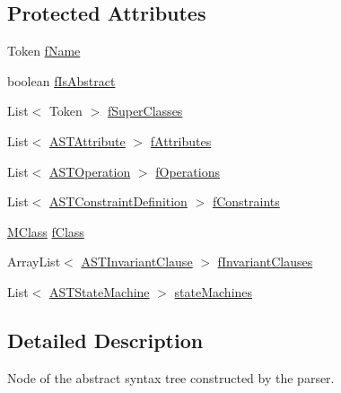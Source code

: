 \subsection*{Protected Attributes}
\begin{DoxyCompactItemize}
\item 
Token \hyperlink{classorg_1_1tzi_1_1use_1_1parser_1_1use_1_1_a_s_t_class_a0c2533e2c8c8e5426c0a87dad0cf850c}{f\-Name}
\item 
boolean \hyperlink{classorg_1_1tzi_1_1use_1_1parser_1_1use_1_1_a_s_t_class_af0ddeb5fdaf847dc54d64ed7d4bcfc5a}{f\-Is\-Abstract}
\item 
List$<$ Token $>$ \hyperlink{classorg_1_1tzi_1_1use_1_1parser_1_1use_1_1_a_s_t_class_a35b71bf1905c82b57cc223433bbedcb0}{f\-Super\-Classes}
\item 
List$<$ \hyperlink{classorg_1_1tzi_1_1use_1_1parser_1_1use_1_1_a_s_t_attribute}{A\-S\-T\-Attribute} $>$ \hyperlink{classorg_1_1tzi_1_1use_1_1parser_1_1use_1_1_a_s_t_class_a15f5be780ef36986a4f94afbe4d80140}{f\-Attributes}
\item 
List$<$ \hyperlink{classorg_1_1tzi_1_1use_1_1parser_1_1use_1_1_a_s_t_operation}{A\-S\-T\-Operation} $>$ \hyperlink{classorg_1_1tzi_1_1use_1_1parser_1_1use_1_1_a_s_t_class_aa91a9797761f3f7260d8d632bf167ae0}{f\-Operations}
\item 
List$<$ \hyperlink{classorg_1_1tzi_1_1use_1_1parser_1_1use_1_1_a_s_t_constraint_definition}{A\-S\-T\-Constraint\-Definition} $>$ \hyperlink{classorg_1_1tzi_1_1use_1_1parser_1_1use_1_1_a_s_t_class_aa87b63de84b1ab405c1b484ae663bdd5}{f\-Constraints}
\item 
\hyperlink{interfaceorg_1_1tzi_1_1use_1_1uml_1_1mm_1_1_m_class}{M\-Class} \hyperlink{classorg_1_1tzi_1_1use_1_1parser_1_1use_1_1_a_s_t_class_ad31d3b0c19e264bc511403a79458cee6}{f\-Class}
\item 
Array\-List$<$ \hyperlink{classorg_1_1tzi_1_1use_1_1parser_1_1use_1_1_a_s_t_invariant_clause}{A\-S\-T\-Invariant\-Clause} $>$ \hyperlink{classorg_1_1tzi_1_1use_1_1parser_1_1use_1_1_a_s_t_class_a45c44026ebececb733d4667e197cd219}{f\-Invariant\-Clauses}
\item 
List$<$ \hyperlink{classorg_1_1tzi_1_1use_1_1parser_1_1use_1_1statemachines_1_1_a_s_t_state_machine}{A\-S\-T\-State\-Machine} $>$ \hyperlink{classorg_1_1tzi_1_1use_1_1parser_1_1use_1_1_a_s_t_class_a145267a1569b153cbf1b845e0a687036}{state\-Machines}
\end{DoxyCompactItemize}


\subsection{Detailed Description}
Node of the abstract syntax tree constructed by the parser.

